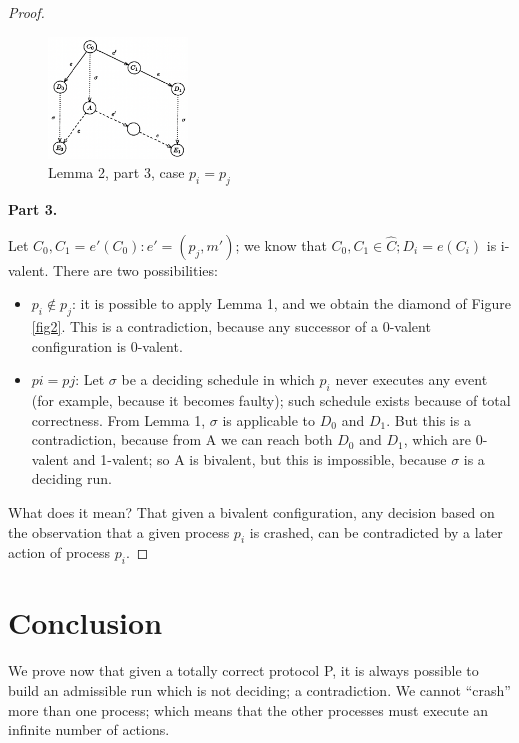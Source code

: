 \documentclass[a4paper,11pt,hidelinks]{article}
\begin{document}
\begin{proof}
    \begin{figure}[!ht]
        \centering
        \includegraphics[width=0.33\textwidth]{drawable/fig3.png}
        \caption{Lemma 2, part 3, case $p_i = p_j$}
        \label{fig3}
    \end{figure}

    \medskip

    \noindent\textbf{Part 3.}

    \medskip

    Let $C_0, C_1 = e'(C_0) : e' = (p_j, m')$; we know that $C_0, C_1 \in \hat{C}; D_i = e(C_i)$ is i-valent. There are two possibilities:

    \begin{itemize}
        \item $p_i \notin p_j$: it is possible to apply Lemma 1, and we obtain the diamond of Figure \ref{fig2}. This is a contradiction, because any successor of a 0-valent configuration is 0-valent.
        \item $pi = pj$: Let $\sigma$ be a deciding schedule in which $p_i$ never executes any event (for example, because it becomes faulty); such schedule exists because of total correctness.
              From Lemma 1, $\sigma$ is applicable to $D_0$ and $D_1$. But this is a contradiction, because from A we can reach both $D_0$ and $D_1$, which are 0-valent and 1-valent; so A is bivalent, but this is impossible, because $\sigma$ is a deciding run.
    \end{itemize}

    What does it mean? That given a bivalent configuration, any decision based
    on the observation that a given process $p_i$ is crashed, can be contradicted by a later action of process $p_i$.
\end{proof}

\section{Conclusion}

We prove now that given a totally correct protocol P, it is always possible to build an admissible run which is not deciding; a contradiction. We cannot “crash” more than one process; which means that the other processes must execute an infinite number of actions.
\end{document}
